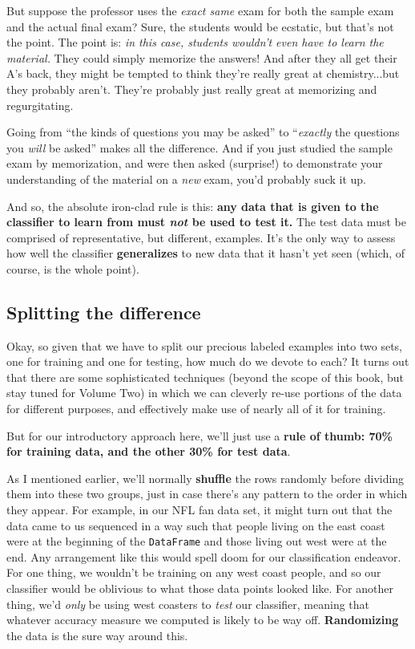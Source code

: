 But suppose the professor uses the \textit{exact same} exam for both the sample
exam and the actual final exam? Sure, the students would be ecstatic, but
that's not the point. The point is: \textit{in this case, students wouldn't
even have to learn the material.} They could simply memorize the answers! And
after they all get their A's back, they might be tempted to think they're
really great at chemistry...but they probably aren't. They're probably just
really great at memorizing and regurgitating.

Going from ``the kinds of questions you may be asked'' to ``\textit{exactly}
the questions you \textit{will} be asked'' makes all the difference. And if you
just studied the sample exam by memorization, and were then asked (surprise!)
to demonstrate your understanding of the material on a \textit{new} exam, you'd
probably suck it up.


And so, the absolute iron-clad rule is this: \textbf{any data that is given to
the classifier to learn from must \textit{not} be used to test it.} The test
data must be comprised of representative, but different, examples. It's the
only way to assess how well the classifier \textbf{generalizes} to new data
that it hasn't yet seen (which, of course, is the whole point).


\subsection{Splitting the difference}

Okay, so given that we have to split our precious labeled examples into two
sets, one for training and one for testing, how much do we devote to each? It
turns out that there are some sophisticated techniques (beyond the scope of
this book, but stay tuned for Volume Two) in which we can cleverly re-use
portions of the data for different purposes, and effectively make use of nearly
all of it for training.

But for our introductory approach here, we'll just use a \textbf{rule of thumb:
70\% for training data, and the other 30\% for test data}.

As I mentioned earlier, we'll normally \textbf{shuffle} the rows randomly
before dividing them into these two groups, just in case there's any pattern to
the order in which they appear. For example, in our NFL fan data set, it might
turn out that the data came to us sequenced in a way such that people living on
the east coast were at the beginning of the \texttt{DataFrame} and those living
out west were at the end. Any arrangement like this would spell doom for our
classification endeavor. For one thing, we wouldn't be training on any west
coast people, and so our classifier would be oblivious to what those data
points looked like. For another thing, we'd \textit{only} be using west
coasters to \textit{test} our classifier, meaning that whatever accuracy
measure we computed is likely to be way off. \textbf{Randomizing} the data is
the sure way around this.

